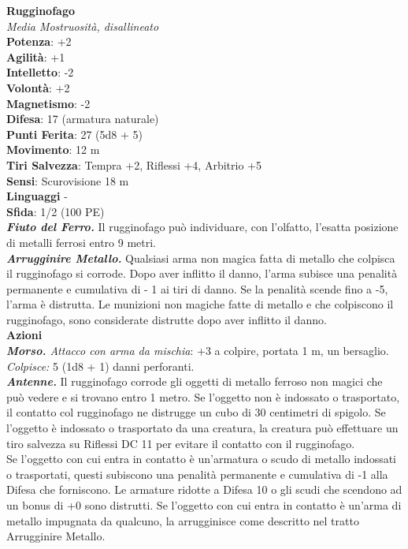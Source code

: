 \begin{multicols}{2}
\medskip\textbf{Rugginofago}\\
\emph{Media Mostruosità, disallineato}\\
\textbf{Potenza}: +2\\
\textbf{Agilità}: +1\\
\textbf{Intelletto}: -2\\
\textbf{Volontà}: +2\\
\textbf{Magnetismo}: -2\\
\textbf{Difesa}: 17 (armatura naturale)\\
\textbf{Punti Ferita}: 27 (5d8 + 5)\\
\textbf{Movimento}: 12 m\\
\textbf{Tiri Salvezza}: Tempra +2, Riflessi +4, Arbitrio +5\\
\textbf{Sensi}: Scurovisione 18 m\\
\textbf{Linguaggi} -\\
\textbf{Sfida}: 1/2 (100 PE)\smallskip\\
\emph{\textbf{Fiuto del Ferro.}} Il rugginofago può individuare, con l'olfatto, l'esatta posizione di metalli ferrosi entro 9 metri.\\
\emph{\textbf{Arrugginire Metallo.}} Qualsiasi arma non magica fatta di metallo che colpisca il rugginofago si corrode. Dopo aver inflitto il danno, l'arma subisce una penalità permanente e cumulativa di - 1 ai tiri di danno. Se la penalità scende fino a -5, l'arma è distrutta. Le munizioni non magiche fatte di metallo e che colpiscono il rugginofago, sono considerate distrutte dopo aver inflitto il danno. \\
\smallskip\textbf{Azioni}\\
\emph{\textbf{Morso.} Attacco con arma da mischia}: +3 a colpire, portata 1 m, un bersaglio.
\emph{Colpisce:} 5 (1d8 + 1) danni perforanti.\\
\emph{\textbf{Antenne.}} Il rugginofago corrode gli oggetti di metallo ferroso non magici che può vedere e si trovano entro 1 metro. Se l'oggetto non è indossato o trasportato, il contatto col rugginofago ne distrugge un cubo di 30 centimetri di spigolo. Se l'oggetto è indossato o trasportato da una creatura, la creatura può effettuare un tiro salvezza su Riflessi DC 11 per evitare il contatto con il rugginofago. \\
Se l'oggetto con cui entra in contatto è un'armatura o scudo di metallo indossati o trasportati, questi subiscono una penalità permanente e cumulativa di -1 alla Difesa che forniscono. Le armature ridotte a Difesa 10 o gli scudi che scendono ad un bonus di +0 sono distrutti. Se l'oggetto con cui entra in contatto è un'arma di metallo impugnata da qualcuno, la arrugginisce come descritto nel tratto Arrugginire Metallo. 

\end{multicols}
